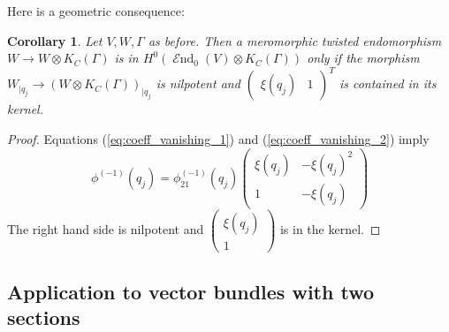 \documentclass[12pt]{extarticle}
\newtheorem{corollary}[theorem]{Corollary}
\theoremstyle{definition}
\numberwithin{theorem}{section}
\DeclareMathOperator{\End}{\mathcal{E}nd}
\begin{document}
Here is a geometric consequence: 
\begin{corollary}\label{cor:nilpotent_fiber}
Let $V,W,\Gamma$ as before. Then a meromorphic twisted endomorphism $W \to W\otimes K_C(\Gamma)$ is in $H^0(\End_0(V)\otimes K_C(\Gamma))$ only if the morphism $W_{|q_j} \to \left(W\otimes  K_C(\Gamma)\right)_{|q_j}$ is nilpotent and $\begin{pmatrix}
\xi(q_j) & 1
\end{pmatrix}^T$ is contained in its kernel.
\end{corollary}
\begin{proof}
Equations (\ref{eq:coeff_vanishing_1}) and (\ref{eq:coeff_vanishing_2}) imply
\begin{equation*}
\phi^{(-1)}(q_j) = \phi_{21}^{(-1)}(q_j)\begin{pmatrix}
\xi(q_j) & -\xi(q_j)^2 \\
1 & -\xi(q_j)
\end{pmatrix}
\end{equation*}
The right hand side is nilpotent and $\begin{pmatrix}
\xi(q_j) \\ 1
\end{pmatrix}$ is in the kernel.  
\end{proof}
\subsection{Application to vector bundles with two sections}
\end{document}
